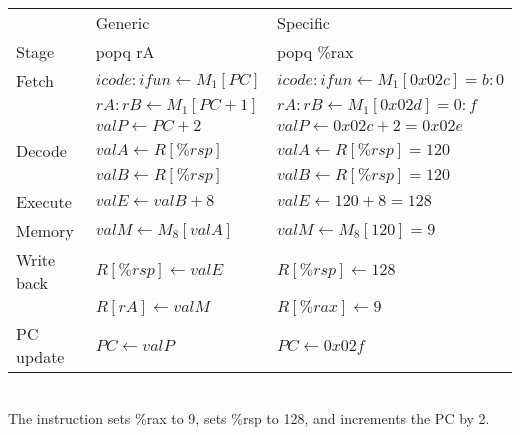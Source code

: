 \documentclass{article}
\begin{document}
\begin{tabular}{l l l}
& Generic & Specific \\
Stage & popq rA & popq \%rax \\
\hline
Fetch & $icode:ifun \leftarrow M_1[PC]$ & $icode:ifun \leftarrow M_1[0x02c]=b:0$ \\
& $rA:rB \leftarrow M_1[PC+1]$ & $rA:rB \leftarrow M_1[0x02d]=0:f$ \\
& $valP \leftarrow PC+2$ & $valP \leftarrow 0x02c + 2 = 0x02e$ \\
Decode & $valA \leftarrow R[\%rsp]$ & $valA \leftarrow R[\%rsp] = 120$ \\
& $valB \leftarrow R[\%rsp]$ & $valB \leftarrow R[\%rsp] = 120$ \\
Execute & $valE \leftarrow valB + 8$ & $valE \leftarrow 120 + 8 = 128$ \\
Memory & $valM \leftarrow M_8[valA]$ & $valM \leftarrow M_8[120] = 9$ \\
Write back & $R[\%rsp] \leftarrow valE$ & $R[\%rsp] \leftarrow 128$ \\
& $R[rA] \leftarrow valM$ & $R[\%rax] \leftarrow 9$ \\
PC update & $PC \leftarrow valP$ & $PC \leftarrow 0x02f$ \\
\end{tabular} \\
The instruction sets \%rax to 9, sets \%rsp to 128, and increments the PC by 2.
\end{document}
